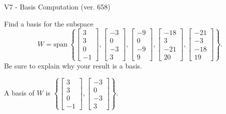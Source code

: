 \begin{exercise}
  \begin{exerciseTitle}V7 - Basis Computation (ver. 658)\end{exerciseTitle}
  \begin{exerciseStatement}
    Find a basis for the subspace 
\[W=\mathrm{span}\ \left\{\left[\begin{array}{r}
3 \\
3 \\
0 \\
-1
\end{array}\right] , \left[\begin{array}{r}
-3 \\
0 \\
-3 \\
3
\end{array}\right] , \left[\begin{array}{r}
-9 \\
0 \\
-9 \\
9
\end{array}\right] , \left[\begin{array}{r}
-18 \\
3 \\
-21 \\
20
\end{array}\right] , \left[\begin{array}{r}
-21 \\
-3 \\
-18 \\
19
\end{array}\right]\right\}.\]
 Be sure to explain why your result is a basis.


  \end{exerciseStatement}
  \begin{exerciseAnswer}
   A basis of \(W\) is  \(\left\{\left[\begin{array}{r}
3 \\
3 \\
0 \\
-1
\end{array}\right] , \left[\begin{array}{r}
-3 \\
0 \\
-3 \\
3
\end{array}\right]\right\}\).
  


  \end{exerciseAnswer}
\end{exercise}